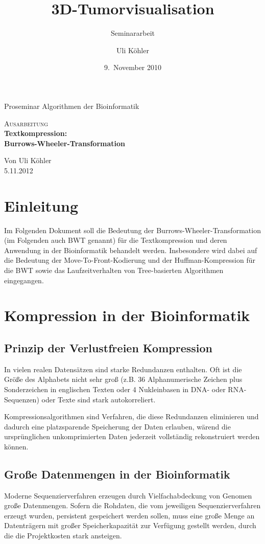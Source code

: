 \documentclass[ngerman,pdftex,paper=A4,DIV=calc,titlepage,12pt]{scrartcl}
\title{3D-Tumorvisualisation}
\subtitle{Seminararbeit}
\author{Uli Köhler}
\date{9.~November 2010}
\newtheorem[L]{boxedDefinition}{Definition}
\begin{document}
\begin{titlepage}
\begin{center}
 Proseminar \glqq Algorithmen der Bioinformatik\grqq
 \end{center}
\vspace{2cm}
\begin{center}
 \large\textsc{Ausarbeitung}\\[5mm]
 {\Huge\centering\bfseries\selectfont Textkompression:\\Burrows-Wheeler-Transformation}\\[2cm]
\begin{center}
  Von Uli Köhler\\
  5.11.2012
\end{center}
\vspace{2cm}
\end{center}
\tableofcontents
\end{titlepage}
\section{Einleitung}
Im Folgenden Dokument soll die Bedeutung der Burrows-Wheeler-Transformation (im Folgenden auch BWT genannt) für die Textkompression und deren Anwendung in der Bioinformatik behandelt werden. Insbesondere wird dabei auf die Bedeutung der Move-To-Front-Kodierung und der Huffman-Kompression für die BWT sowie das Laufzeitverhalten von Tree-basierten Algorithmen eingegangen.
\section{Kompression in der Bioinformatik}
\subsection{Prinzip der Verlustfreien Kompression}
In vielen realen Datensätzen sind starke Redundanzen enthalten. Oft ist die Größe des Alphabets nicht sehr groß (z.B. 36 Alphanumerische Zeichen plus Sonderzeichen in englischen Texten oder 4 Nukleinbasen in DNA- oder RNA-Sequenzen) oder Texte sind stark autokorreliert.

Kompressionsalgorithmen sind Verfahren, die diese Redundanzen eliminieren und dadurch eine platzsparende Speicherung der Daten erlauben, wärend die ursprünglichen unkomprimierten Daten jederzeit vollständig rekonstruiert werden können.
\subsection{Große Datenmengen in der Bioinformatik}
Moderne Sequenzierverfahren erzeugen durch Vielfachabdeckung von Genomen große Datenmengen. Sofern die Rohdaten, die vom jeweiligen Sequenzierverfahren erzeugt wurden, persistent gespeichert werden sollen, muss eine große Menge an Datenträgern mit großer Speicherkapazität zur Verfügung gestellt werden, durch die die Projektkosten stark ansteigen.
\end{document}
